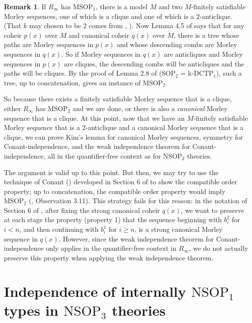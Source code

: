 \documentclass[12pt]{amsart}
\theoremstyle{definition}
\newtheorem{remark}[theorem]{Remark}
\begin{document}
\begin{remark}
    
    If $R_{\infty}$ has $\mathrm{MSOP}_{1}$, there is a model $M$ and two $M$-finitely satisfiable Morley sequences, one of which is a clique and one of which is a $2$-anticlique. (That $k$ may chosen to be $2$ comes from \cite{Lee22}, \cite{KR17}). Now Lemma 4.5 of \cite{NSOP2} says that for any coheir $p(x)$ over $M$ and canonical coheir $q(x)$ over $M$, there is a tree whose paths are Morley sequences in $p(x)$ and whose descending combs are Morley sequences in $q(x)$. So if Morley sequences in $q(x)$ are anticliques and Morley sequences in $p(x)$ are cliques, the descending combs will be anticliques and the paths will be cliques. By the proof of Lemma 2.8 of \cite{NSOP2} ($\mathrm{SOP}_{2}$ = k-$\mathrm{DCTP}_{1}$), such a tree, up to concatenation, gives an instance of $\mathrm{MSOP}_{2}$.

    So because there exists a finitely satisfiable Morley sequence that is a clique, either $R_{\infty}$ has $\mathrm{MSOP}_{2}$ and we are done, or there is also a \textit{canonical} Morley sequence that is a clique. At this point, now that we have an $M$-finitely satisfiable Morley sequence that is a $2$-anticlique and a canonical Morley sequence that is a clique, we can prove Kim's lemma for canonical Morley sequences, symmetry for Conant-independence, and the weak independence theorem for Conant-independence, all in the quantifier-free context as for $\mathrm{NSOP}_{2}$ theories. 
    
    
    The argument is valid up to this point. But then, we may try to use the technique of Conant (\cite{Co15}) developed in Section 6 of \cite{NSOP2} to show the compatible order property; up to concatenation, the compatible order property would imply $\mathrm{MSOP}_{2}$ (\cite{Mal10}, Observation 3.11). This strategy fails for this reason: in the notation of Section 6 of \cite{NSOP2}, after fixing the strong canonical coheir $q(x)$, we want to preserve at each stage the property (property 1) that the sequence beginning with $b_{i}^{2}$ for $i < n$, and then continuing with $b_{i}^{1}$ for $i \geq n$, is a strong canonical Morley sequence in $q(x)$. However, since the weak independence theorem for Conant-independence only applies in the quantifier-free context in $R_{\infty}$, we do not actually preserve this property when applying the weak independence theorem.

    
\end{remark}



\section{Independence of internally $\mathrm{NSOP}_{1}$ types in $\mathrm{NSOP}_{3}$ theories}
\end{document}
